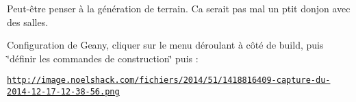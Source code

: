 Peut-\/être penser à la génération de terrain. Ca serait pas mal un ptit donjon avec des salles.

Configuration de Geany, cliquer sur le menu déroulant à côté de build, puis \char`\"{}définir les commandes de construction\char`\"{} puis \-:

\href{http://image.noelshack.com/fichiers/2014/51/1418816409-capture-du-2014-12-17-12-38-56.png}{\tt http\-://image.\-noelshack.\-com/fichiers/2014/51/1418816409-\/capture-\/du-\/2014-\/12-\/17-\/12-\/38-\/56.\-png} 